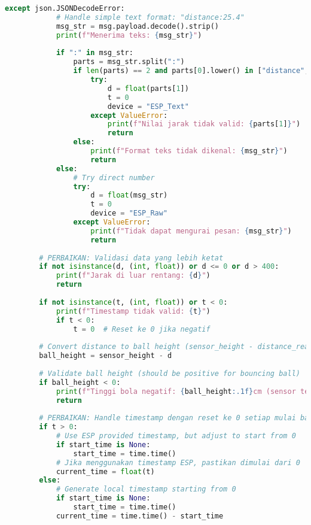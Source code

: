 \begin{itemize}
\begin{scriptsize}
\begin{lstlisting}[language=python]
        except json.JSONDecodeError:
            # Handle simple text format: "distance:25.4"
            msg_str = msg.payload.decode().strip()
            print(f"Menerima teks: {msg_str}")
            
            if ":" in msg_str:
                parts = msg_str.split(":")
                if len(parts) == 2 and parts[0].lower() in ["distance", "dist"]:
                    try:
                        d = float(parts[1])
                        t = 0
                        device = "ESP_Text"
                    except ValueError:
                        print(f"Nilai jarak tidak valid: {parts[1]}")
                        return
                else:
                    print(f"Format teks tidak dikenal: {msg_str}")
                    return
            else:
                # Try direct number
                try:
                    d = float(msg_str)
                    t = 0
                    device = "ESP_Raw"
                except ValueError:
                    print(f"Tidak dapat mengurai pesan: {msg_str}")
                    return
        
        # PERBAIKAN: Validasi data yang lebih ketat
        if not isinstance(d, (int, float)) or d <= 0 or d > 400:
            print(f"Jarak di luar rentang: {d}")
            return
        
        if not isinstance(t, (int, float)) or t < 0:
            print(f"Timestamp tidak valid: {t}")
            if t < 0:
                t = 0  # Reset ke 0 jika negatif
        
        # Convert distance to ball height (sensor_height - distance_reading)
        ball_height = sensor_height - d
        
        # Validate ball height (should be positive for bouncing ball)
        if ball_height < 0:
            print(f"Tinggi bola negatif: {ball_height:.1f}cm (sensor terlalu rendah?)")
            return
        
        # PERBAIKAN: Handle timestamp dengan reset ke 0 setiap mulai baru
        if t > 0:
            # Use ESP provided timestamp, but adjust to start from 0
            if start_time is None:
                start_time = time.time()
            # Jika menggunakan timestamp ESP, pastikan dimulai dari 0
            current_time = float(t)
        else:
            # Generate local timestamp starting from 0
            if start_time is None:
                start_time = time.time()
            current_time = time.time() - start_time
        

\end{lstlisting}
\end{scriptsize}
\end{itemize}
